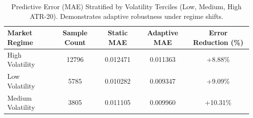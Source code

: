 \begin{table}[t]
\centering
\caption{Predictive Error (MAE) Stratified by Volatility Terciles (Low, Medium, High ATR-20). Demonstrates adaptive robustness under regime shifts.}
\label{tab:regime_ablation}
\begin{tabular}{lcccc}
\hline
\textbf{Market Regime} & \textbf{Sample Count} & \textbf{Static MAE} & \textbf{Adaptive MAE} & \textbf{Error Reduction (\%)} \\
\hline
High Volatility & 12796 & 0.012471 & 0.011363 & +8.88\% \\
Low Volatility & 5785 & 0.010282 & 0.009347 & +9.09\% \\
Medium Volatility & 3805 & 0.011105 & 0.009960 & +10.31\% \\
\hline
\end{tabular}
\end{table}
